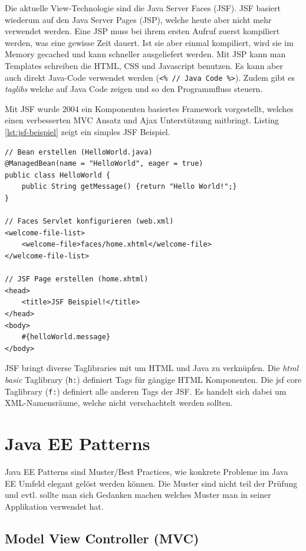 Die aktuelle View-Technologie sind die Java Server Faces (JSF). JSF basiert wiederum auf den Java Server Pages (JSP), welche heute aber nicht mehr verwendet werden. Eine JSP muss bei ihrem ersten Aufruf zuerst kompiliert werden, was eine gewisse Zeit dauert. Ist sie aber einmal kompiliert, wird sie im Memory gecached und kann schneller ausgeliefert werden. Mit JSP kann man Templates schreiben die HTML, CSS und Javascript benutzen. Es kann aber auch direkt Java-Code verwendet werden (\verb|<% // Java Code %>|). Zudem gibt es \textit{taglibs} welche auf Java Code zeigen und so den Programmfluss steuern.

Mit JSF wurde 2004 ein Komponenten basiertes Framework vorgestellt, welches einen verbesserten MVC Ansatz und Ajax Unterstützung mitbringt. Listing \ref{lst:jsf-beispiel} zeigt ein simples JSF Beispiel.

\begin{lstlisting}[caption=JSF Beispiel, label=lst:jsf-beispiel]
// Bean erstellen (HelloWorld.java)
@ManagedBean(name = "HelloWorld", eager = true)
public class HelloWorld {
	public String getMessage() {return "Hello World!";}
}

// Faces Servlet konfigurieren (web.xml)
<welcome-file-list>
	<welcome-file>faces/home.xhtml</welcome-file>
</welcome-file-list>

// JSF Page erstellen (home.xhtml)
<head>
	<title>JSF Beispiel!</title>
</head>
<body>
	#{helloWorld.message}
</body>
\end{lstlisting}

JSF bringt diverse Taglibraries mit um HTML und Java zu verknüpfen. Die \textit{html basic} Taglibrary (\verb|h:|) definiert Tags für gängige HTML Komponenten. Die jsf core Taglibrary (\verb|f:|) definiert alle anderen Tags der JSF. Es handelt sich dabei um XML-Namensräume, welche nicht verschachtelt werden sollten.

\section{Java EE Patterns}
Java EE Patterns sind Muster/Best Practices, wie konkrete Probleme im Java EE Umfeld elegant gelöst werden können. Die Muster sind nicht teil der Prüfung und evtl. sollte man sich Gedanken machen welches Muster man in seiner Applikation verwendet hat.

\subsection{Model View Controller (MVC)}

